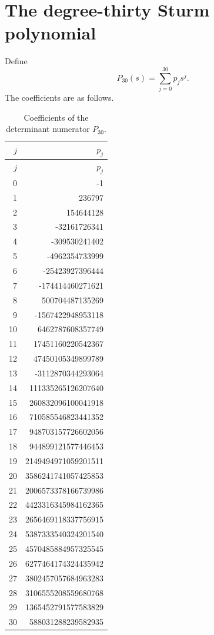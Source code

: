 \documentclass[11pt]{article}
\theoremstyle{definition}
\begin{document}
\section{The degree-thirty Sturm polynomial}\label{app:P30}
Define
\[
P_{30}(s)=\sum_{j=0}^{30}p_js^j.
\]
The coefficients are as follows.
\begin{longtable}{r@{\hspace{2em}}r}
\caption{Coefficients of the determinant numerator \(P_{30}\).}\label{tab:P30coeffs}\\
\toprule
\(j\)&\(p_j\)\\
\midrule
\endfirsthead
\toprule
\(j\)&\(p_j\)\\
\midrule
\endhead
0 & -1 \\
1 & 236797 \\
2 & 154644128 \\
3 & -32161726341 \\
4 & -309530241402 \\
5 & -4962354733999 \\
6 & -25423927396444 \\
7 & -174414460271621 \\
8 & 500704487135269 \\
9 & -1567422948953118 \\
10 & 6462787608357749 \\
11 & 17451160220542367 \\
12 & 47450105349899789 \\
13 & -3112870344293064 \\
14 & 111335265126207640 \\
15 & 260832096100041918 \\
16 & 710585546823441352 \\
17 & 948703157726602056 \\
18 & 944899121577446453 \\
19 & 2149494971059201511 \\
20 & 3586241741057425853 \\
21 & 2006573378166739986 \\
22 & 4423316345984162365 \\
23 & 2656469118337756915 \\
24 & 5387333540324201540 \\
25 & 4570485884957325545 \\
26 & 6277464174324435942 \\
27 & 3802457057684963283 \\
28 & 3106555208559680768 \\
29 & 1365452791577583829 \\
30 & 588031288239582935 \\
\bottomrule
\end{longtable}
\end{document}
